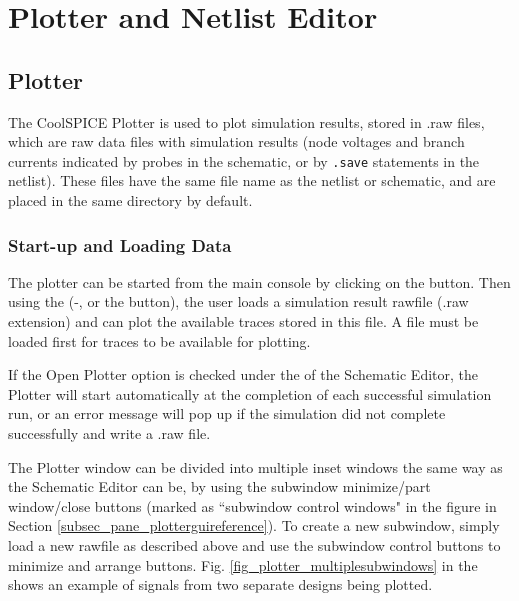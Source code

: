 \chapter{Plotter and Netlist Editor}

\label{chap_plotterandnetlisteditor_pane}

\section{Plotter}
\label{sec_pane_plotter}

The CoolSPICE Plotter is used to plot simulation results, stored in \textsf{.raw} files, which are raw data files with simulation results (node voltages and branch currents indicated by probes in the schematic, or by \texttt{.save} statements in the netlist).  These files have the same file name as the netlist or schematic, and are placed in the same directory by default.  

\subsection{Start-up and Loading Data}
\label{subsec_pane_startuploadingdata}

The plotter can be started from the main console by clicking on the  button.  Then using the  (-, or the  button), the user loads a simulation result rawfile (\textsf{.raw} extension) and can plot the available traces stored in this file.  A file must be loaded first for traces to be available for plotting.

If the \textsf{Open Plotter} option is checked under the  of the Schematic Editor, the Plotter will start automatically at the completion of each successful simulation run, or an error message will pop up if the simulation did not complete successfully and write a \textsf{.raw} file.

 The Plotter window can be divided into multiple inset windows the same way as the Schematic Editor can be, by using the subwindow minimize/part window/close buttons (marked as ``subwindow control windows" in the figure in Section \ref{subsec_pane_plotterguireference}).  To create a new subwindow, simply load a new rawfile as described above and use the subwindow control buttons to minimize and arrange buttons.  Fig. \ref{fig_plotter_multiplesubwindows} in the shows an example of signals from two separate designs being plotted.


